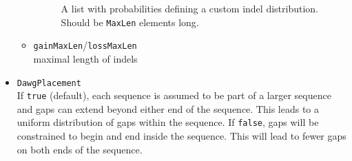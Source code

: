 \documentclass[11pt]{article}
\begin{document}
\begin{itemize}
\begin{itemize}
\begin{description}
A list with probabilities defining a custom indel distribution. Should be \texttt{MaxLen} elements long.
\end{description}

\item{\texttt{gainMaxLen}/\texttt{lossMaxLen}} \hfill \\
maximal length of indels
\end{itemize}
\item{\texttt{DawgPlacement}} \hfill \\
If \texttt{true} (default), each sequence is assumed to be part of a larger sequence and gaps can extend beyond either end of the sequence. This leads to a uniform distribution of gaps within the sequence. If \texttt{false}, gaps will be constrained to begin and end inside the sequence. This will lead to fewer gaps on both ends of the sequence.
\end{itemize}
\end{document}
